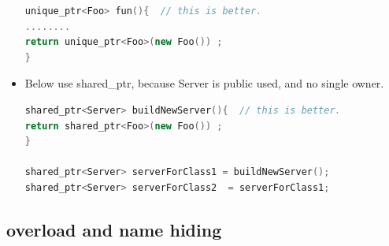 \documentclass[a4paper,12pt,twoside]{book}
\begin{document}
\begin{itemize}
\begin{lstlisting}[frame=single, language=c++]
unique_ptr<Foo> fun(){  // this is better.
........
return unique_ptr<Foo>(new Foo()) ;
}
\end{lstlisting}
\item Below use shared\_ptr, because Server is public used, and no single owner.
\begin{lstlisting}[frame=single, language=c++]
shared_ptr<Server> buildNewServer(){  // this is better.
return shared_ptr<Foo>(new Foo()) ;
}

shared_ptr<Server> serverForClass1 = buildNewServer();
shared_ptr<Server> serverForClass2  = serverForClass1;
\end{lstlisting}

\end{itemize}


\subsection{overload and name hiding}
\end{document}
